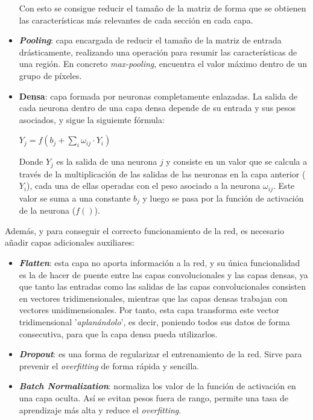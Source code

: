 \documentclass{uc3mpracticas}
\begin{document}
\begin{itemize}
    \vspace{2mm}

    Con esto se consigue reducir el tamaño de la matriz de forma que se obtienen las características más relevantes de cada sección en cada capa.


    \item \textbf{\textit{Pooling}}: capa encargada de reducir el tamaño de la matriz de entrada drásticamente, realizando una operación para resumir las características de una región. En concreto \textit{max-pooling}, encuentra el valor máximo dentro de un grupo de píxeles.

    \item \textbf{Densa}: capa formada por neuronas completamente enlazadas. La salida de cada neurona dentro de una capa densa depende de su entrada y sus pesos asociados, y sigue la siguiemte fórmula:

    \begin{center}
      $ \displaystyle Y_{j}=f\left(b_{j}+\sum_{i}\omega_{ij} \cdot Y_{i}\right)$
    \end{center}


    Donde $\displaystyle Y_{j}$ es la salida de una neurona $\displaystyle j$ y consiste en un valor que se calcula a través de la multiplicación de las salidas de las neuronas en la capa anterior ($\displaystyle Y_{i}$), cada una de ellas operadas con el peso asociado a la neurona $\omega_{ij}$. Este valor se suma a una constante $\displaystyle b_{j}$ y luego se pasa por la función de activación de la neurona ($\displaystyle f()$).

  \end{itemize}

  Además, y para conseguir el correcto funcionamiento de la red, es necesario añadir capas adicionales auxiliares:

  \begin{itemize}
    \item \textbf{\textit{Flatten}}: esta capa no aporta información a la red, y su única funcionalidad es la de hacer de puente entre las capas convolucionales y las capas densas, ya que tanto las entradas como las salidas de las capas convolucionales consisten en vectores tridimensionales, mientras que las capas densas trabajan con vectores unidimensionales. Por tanto, esta capa transforma este vector tridimensional '\textit{aplanándolo}', es decir, poniendo todos sus datos de forma consecutiva, para que la capa densa pueda utilizarlos.

    \item \textbf{\textit{Dropout}}: es una forma de regularizar el entrenamiento de la red. Sirve para prevenir el \textit{overfitting} de forma rápida y sencilla.

    \item \textbf{\textit{Batch Normalization}}: normaliza los valor de la función de activación en una capa oculta. Así se evitan pesos fuera de rango, permite una tasa de aprendizaje más alta y reduce el \textit{overfitting}.

  \end{itemize}
\end{document}
